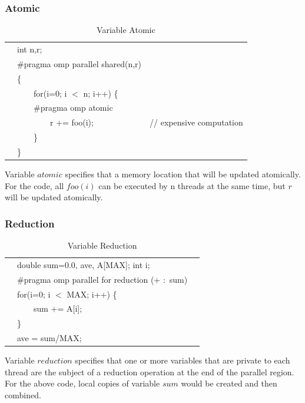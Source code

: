 \documentclass[twoside]{article}
\newcounter{magicrownumbers}
\newcommand\rownumber{\stepcounter{magicrownumbers}\arabic{magicrownumbers}}
\begin{document}
\subsubsection{Atomic}
\begin{table}[!ht]
    \centering
    \begin{tabular}{l  l  l }
    \hline
        \rownumber & int  n,r;  \\ 
        \rownumber & {\color{red}$\#$pragma omp parallel shared(n,r)} \\ 
        \rownumber & \{ \\ 
        \rownumber & \ \ \ \ for(i=0; i $<$ n; i++) \{  \\ 
        \rownumber & \ \ \ \ {\color{red}$\#$pragma omp atomic} \\ 
        \rownumber & \ \ \ \ \ \ \ \ r += foo(i); & // expensive computation \\ 
        \rownumber & \ \ \ \ \} \\
        \rownumber & \} \\
        \hline
    \end{tabular}
    \caption*{Variable Atomic}
\end{table}
\setcounter{magicrownumbers}{0}
Variable $atomic$ specifies that a memory location that will be updated atomically. For the code, all $foo(i)$ can be executed by n threads at the same time, but $r$ will be updated atomically. 

\subsubsection{Reduction}
\begin{table}[!ht]
    \centering
    \begin{tabular}{l  l  l }
    \hline
        \rownumber & double sum=0.0, ave, A[MAX]; int i;  \\ 
        \rownumber & {\color{red}$\#$pragma omp parallel for reduction (+ $\colon$ sum)} \\ 
        \rownumber & for(i=0; i $<$ MAX; i++) \{  \\ 
        \rownumber & \ \ \ \ sum += A[i];  \\ 
        \rownumber & \} \\
        \rownumber & ave = sum/MAX;\\
        \hline
    \end{tabular}
    \caption*{Variable Reduction}
\end{table}
\setcounter{magicrownumbers}{0}
Variable $reduction$ specifies that one or more variables that are private to each thread are the subject of a reduction operation at the end of the parallel region. For the above code, local copies of variable $sum$ would be created and then combined.
\end{document}
